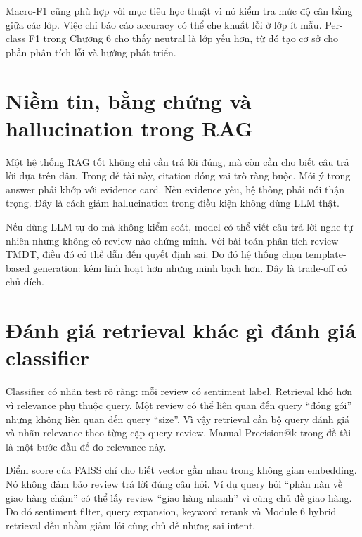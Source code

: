 Macro-F1 cũng phù hợp với mục tiêu học thuật vì nó kiểm tra mức độ cân bằng giữa các lớp. Việc chỉ báo cáo accuracy có thể che khuất lỗi ở lớp ít mẫu. Per-class F1 trong Chương 6 cho thấy neutral là lớp yếu hơn, từ đó tạo cơ sở cho phần phân tích lỗi và hướng phát triển.

\section{Niềm tin, bằng chứng và hallucination trong RAG}
Một hệ thống RAG tốt không chỉ cần trả lời đúng, mà còn cần cho biết câu trả lời dựa trên đâu. Trong đề tài này, citation đóng vai trò ràng buộc. Mỗi ý trong answer phải khớp với evidence card. Nếu evidence yếu, hệ thống phải nói thận trọng. Đây là cách giảm hallucination trong điều kiện không dùng LLM thật.

Nếu dùng LLM tự do mà không kiểm soát, model có thể viết câu trả lời nghe tự nhiên nhưng không có review nào chứng minh. Với bài toán phân tích review TMĐT, điều đó có thể dẫn đến quyết định sai. Do đó hệ thống chọn template-based generation: kém linh hoạt hơn nhưng minh bạch hơn. Đây là trade-off có chủ đích.

\section{Đánh giá retrieval khác gì đánh giá classifier}
Classifier có nhãn test rõ ràng: mỗi review có sentiment label. Retrieval khó hơn vì relevance phụ thuộc query. Một review có thể liên quan đến query “đóng gói” nhưng không liên quan đến query “size”. Vì vậy retrieval cần bộ query đánh giá và nhãn relevance theo từng cặp query-review. Manual Precision@k trong đề tài là một bước đầu để đo relevance này.

Điểm score của FAISS chỉ cho biết vector gần nhau trong không gian embedding. Nó không đảm bảo review trả lời đúng câu hỏi. Ví dụ query hỏi “phàn nàn về giao hàng chậm” có thể lấy review “giao hàng nhanh” vì cùng chủ đề giao hàng. Do đó sentiment filter, query expansion, keyword rerank và Module 6 hybrid retrieval đều nhằm giảm lỗi cùng chủ đề nhưng sai intent.

